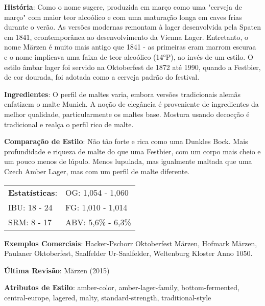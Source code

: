 \textbf{História}: Como o nome sugere, produzida em março como uma "cerveja de março" com maior teor alcoólico e com uma maturação longa em caves frias durante o verão. As versões modernas remontam à lager desenvolvida pela Spaten em 1841, ccontemporânea ao desenvolvimento da Vienna Lager. Entretanto, o nome Märzen é muito mais antigo que 1841 - as primeiras eram marrom escuraa e o nome implicava uma faixa de teor alcoólico (14°P), ao invés de um estilo. O estilo âmbar lager foi servido na Oktoberfest de 1872 até 1990, quando a Festbier, de cor dourada, foi adotada como a cerveja padrão do festival.

\textbf{Ingredientes}: O perfil de maltes varia, embora versões tradicionais alemãs enfatizem o malte Munich. A noção de elegância é proveniente de ingredientes da melhor qualidade, particularmente os maltes base. Mostura usando decocção é tradicional e realça o perfil rico de malte.

\textbf{Comparação de Estilo}: Não tão forte e rica como uma Dunkles Bock. Mais profundidade e riqueza de malte do que uma Festbier, com um corpo mais cheio e um pouco menos de lúpulo. Menos lupulada, mas igualmente maltada que uma Czech Amber Lager, mas com um perfil de malte diferente.

\begin{tabular}{@{}p{35mm}p{35mm}@{}}
  \textbf{Estatísticas}: & OG: 1,054 - 1,060 \\
  IBU: 18 - 24  & FG: 1,010 - 1,014  \\
  SRM: 8 - 17  & ABV: 5,6\% - 6,3\%
\end{tabular}

\textbf{Exemplos Comerciais}: Hacker-Pschorr Oktoberfest Märzen, Hofmark Märzen, Paulaner Oktoberfest, Saalfelder Ur-Saalfelder, Weltenburg Kloster Anno 1050.

\textbf{Última Revisão}: Märzen (2015)

\textbf{Atributos de Estilo}: amber-color, amber-lager-family, bottom-fermented, central-europe, lagered, malty, standard-strength, traditional-style
